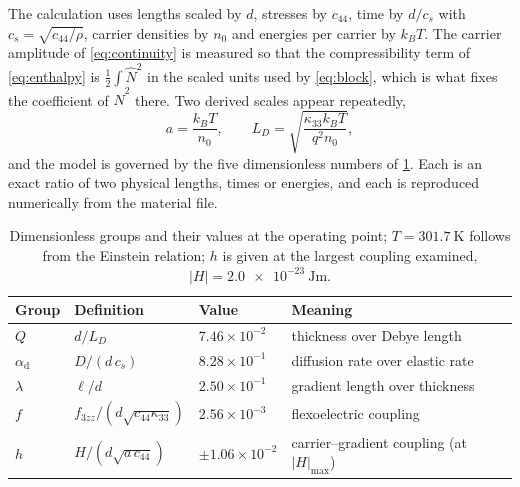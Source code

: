 The calculation uses lengths scaled by $d$, stresses by $c_{44}$, time by
$d/c_s$ with $c_s=\sqrt{c_{44}/\rho}$, carrier densities by $n_0$ and energies
per carrier by $k_BT$.  The carrier amplitude of \eqref{eq:continuity} is
measured so that the compressibility term of \eqref{eq:enthalpy} is
$\tfrac12\int\widehat N^{2}$ in the scaled units used by \eqref{eq:block}, which
is what fixes the coefficient of $\widehat N^{2}$ there.  Two derived scales appear repeatedly,
\begin{equation*}
a=\frac{k_BT}{n_0},\qquad L_D=\sqrt{\frac{\kappa_{33}k_BT}{q^2n_0}},
\end{equation*}
and the model is governed by the five dimensionless numbers of
\cref{tab:groups}.  Each is an exact ratio of two physical lengths, times or
energies, and each is reproduced numerically from the material file.

\begin{table}[t]
\centering
\caption{Dimensionless groups and their values at the operating point; $T=\SI{301.7}{\kelvin}$ follows from the Einstein relation; $h$ is given at the largest coupling examined, $|H|=\SI{2.0e-23}{\joule\metre}$.}
\label{tab:groups}
\begin{tabular}{@{}llll@{}}
\toprule
Group & Definition & Value & Meaning \\
\midrule
$Q$ & $d/L_D$ & $7.46\times10^{-2}$ & thickness over Debye length \\
$\alpha_{\mathrm{d}}$ & $D/(d\,c_s)$ & $8.28\times10^{-1}$ & diffusion rate over elastic rate \\
$\lambda$ & $\ell/d$ & $2.50\times10^{-1}$ & gradient length over thickness \\
$f$ & $f_{3zz}/(d\sqrt{c_{44}\kappa_{33}})$ & $2.56\times10^{-3}$ & flexoelectric coupling \\
$h$ & $H/(d\sqrt{a\,c_{44}})$ & $\pm1.06\times10^{-2}$ & carrier--gradient coupling (at $|H|_{\max}$) \\
\bottomrule
\end{tabular}
\end{table}

